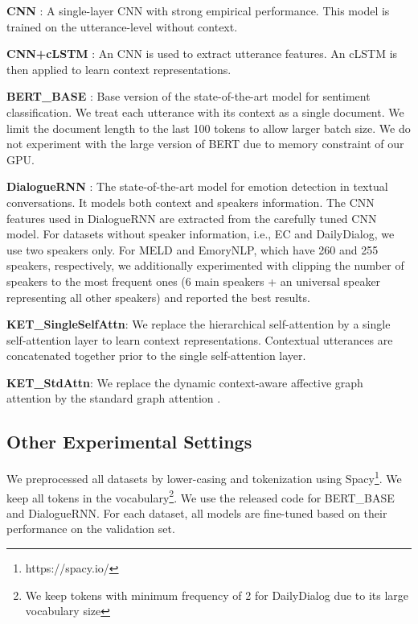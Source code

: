 \documentclass[11pt,a4paper]{article}
\begin{document}
\noindent\textbf{CNN} \cite{kim2014convolutional}: A single-layer CNN with strong empirical performance. This model is trained on the utterance-level without context.

\noindent\textbf{CNN+cLSTM} \cite{poria2017context}: An CNN is used to extract utterance features. An cLSTM is then applied to learn context representations.



\noindent\textbf{BERT\_BASE} \cite{devlin2018bert}: Base version of the state-of-the-art model for sentiment classification. We treat each utterance with its context as a single document. We limit the document length to the last 100 tokens to allow larger batch size. We do not experiment with the large version of BERT due to memory constraint of our GPU.

\noindent\textbf{DialogueRNN} \cite{majumder2018dialoguernn}: The state-of-the-art model for emotion detection in textual conversations. It models both context and speakers information. The CNN features used in DialogueRNN are extracted from the carefully tuned CNN model. For datasets without speaker information, i.e., EC and DailyDialog, we use two speakers only. For MELD and EmoryNLP, which have 260 and 255 speakers, respectively, we additionally experimented with clipping the number of speakers to the most frequent ones (6 main speakers + an universal speaker representing all other speakers) and reported the best results.

\noindent\textbf{KET\_SingleSelfAttn}: We replace the hierarchical self-attention by a single self-attention layer to learn context representations. Contextual utterances are concatenated together prior to the single self-attention layer.

\noindent\textbf{KET\_StdAttn}: We replace the dynamic context-aware affective graph attention by the standard graph attention \cite{veličković2018graph}.

\subsection{Other Experimental Settings}
\label{sec: experimental settings}
We preprocessed all datasets by lower-casing and tokenization using Spacy\footnote{https://spacy.io/}. We keep all tokens in the vocabulary\footnote{We keep tokens with minimum frequency of 2 for DailyDialog due to its large vocabulary size}. We use the released code for BERT\_BASE and DialogueRNN. For each dataset, all models are fine-tuned based on their performance on the validation set. 
\end{document}
